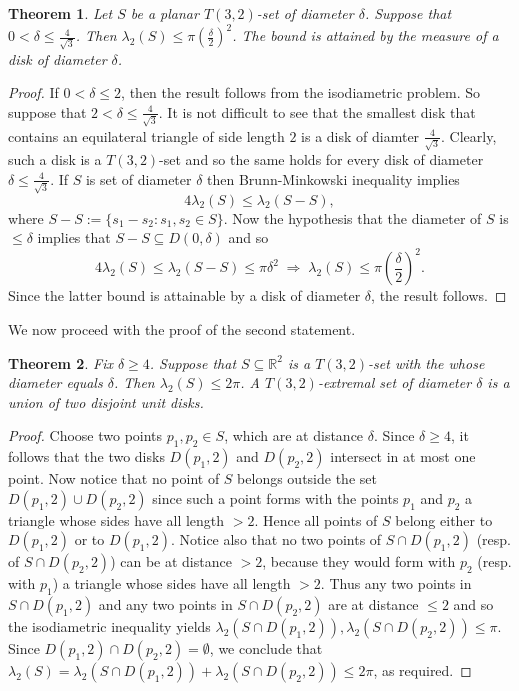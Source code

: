 \documentclass[12pt]{article}
\newtheorem{thm}{Theorem}[section]
\begin{document}
\begin{thm} Let $S$ be a planar $T(3,2)$-set of diameter $\delta$. 
Suppose that $0<\delta \leq \frac{4}{\sqrt{3}}$. 
Then $\lambda_2(S)\leq \pi \left(\frac{\delta}{2}\right)^2$. The bound is attained by
the measure of a disk of diameter $\delta$. 
\end{thm}
\begin{proof} If $0<\delta\leq 2$, then the result follows from the isodiametric problem.
So suppose that $2<\delta\leq \frac{4}{\sqrt{3}}$. 
It is not difficult to see that the smallest disk that contains
an equilateral triangle of side length $2$ is a disk of diamter $\frac{4}{\sqrt{3}}$. 
Clearly, such a disk is a $T(3,2)$-set and so the same holds for every disk of diameter
$\delta \leq \frac{4}{\sqrt{3}}$.
If $S$ is set of diameter $\delta$ then Brunn-Minkowski inequality implies 
\[ 4\lambda_2(S) \leq \lambda_2(S-S) , \]
where $S-S:=\{s_1-s_2: s_1,s_2\in S\}$. Now the hypothesis that
the diameter of $S$ is $\leq \delta$ implies that $S-S\subseteq D(0,\delta)$ and so
\[  4\lambda_2(S) \leq \lambda_2(S-S) \leq \pi \delta^2 \; \Rightarrow \; \lambda_2(S)\leq \pi \left(\frac{\delta}{2}\right)^2 . \]
Since the latter bound is attainable by a disk of diameter $\delta$, the result follows.
\end{proof}

We now proceed with the proof of the second statement. 

\begin{thm}
\label{mainprop} Fix $\delta\geq 4$. Suppose that $S\subseteq \mathbb{R}^2$ is a $T(3,2)$-set with the
whose diameter equals $\delta$.
Then  $\lambda_2(S)\leq 2\pi$. A $T(3,2)$-extremal set of diameter $\delta$ is
a union of two disjoint unit disks. 
\end{thm}
\begin{proof} Choose two points $p_1,p_2\in S$, which are at distance $\delta$.
Since $\delta\geq 4$, it follows that the two disks $D(p_1,2)$ and $D(p_2,2)$ intersect in at most one point.
Now notice that no point of $S$ belongs outside the set $D(p_1,2)\cup D(p_2,2)$ since such a point 
forms with the points $p_1$ and $p_2$ a triangle whose sides have all length $>2$. Hence all points
of $S$ belong  either to $D(p_1,2)$ or to $D(p_1,2)$. 
Notice also that no two points of $S\cap D(p_1,2)$ (resp. of $S\cap D(p_2,2)$)
can be at distance $>2$, because they would form with $p_2$ (resp. with $p_1$)
a triangle whose sides have all length $>2$. Thus any two points in $S \cap D(p_1,2)$ and any two points in 
$S \cap D(p_2,2)$
are at distance $\leq 2$ and so the isodiametric inequality yields
$\lambda_2(S\cap D(p_1,2)),\lambda_2(S\cap D(p_2,2))\leq \pi$.
Since  $D(p_1,2)\cap D(p_2,2)=\emptyset$, we conclude that 
$\lambda_2(S)=\lambda_2(S\cap D(p_1,2))+\lambda_2(S \cap D(p_2,2))\leq 2\pi$, as required.
\end{proof}
\end{document}
